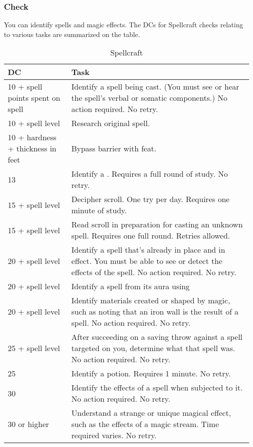 \subsubsection{Check}
You can identify spells and magic effects. The DCs for Spellcraft checks relating to various tasks are summarized on the  table.
\begin{table*}
\centering
\caption{Spellcraft}
\label{tab:Spellcraft}
\begin{tabular}{p{}p{}}
\toprule
\textbf{DC}&\textbf{Task}\\
\midrule
10 + spell points spent on spell&Identify a spell being cast. (You must see or hear the spell's verbal or somatic components.) No action required. No retry.\\
10 + spell level&Research original spell.\\
10 + hardness + thickness in feet&Bypass barrier with \nameref{Feat:BurrowingSpell} feat.\\
13 &Identify a \nameref{Spell:GlyphOfWarding}. Requires a full round of study. No retry.\\
15 + spell level&Decipher scroll. One try per day. Requires one minute of study.\\
15 + spell level&Read scroll in preparation for casting an unknown spell. Requires one full round. Retries allowed.\\
20 + spell level&Identify a spell that's already in place and in effect. You must be able to see or detect the effects of the spell. No action required. No retry.\\
20 + spell level&Identify a spell from its aura using \nameref{Spell:DetectMagic}\\
20 + spell level&Identify materials created or shaped by magic, such as noting that an iron wall is the result of a \nameref{Spell:WallOfIron} spell. No action required. No retry.\\
25 + spell level&After succeeding on a saving throw against a spell targeted on you, determine what that spell was. No action required. No retry.\\
25 &Identify a potion. Requires 1 minute. No retry.\\
30 &Identify the effects of a \nameref{Spell:PlanarBinding} spell when subjected to it. No action required. No retry.\\
30 or higher&Understand a strange or unique magical effect, such as the effects of a magic stream. Time required varies. No retry.\\
\bottomrule
\end{tabular}
\normalsize
\end{table*}
